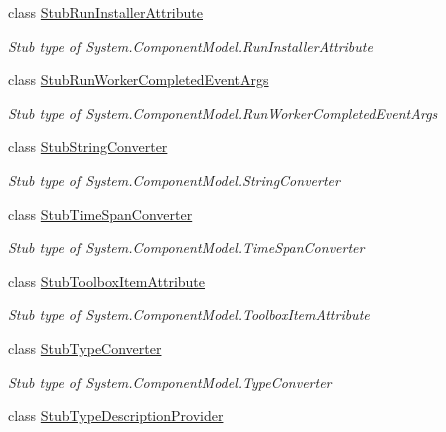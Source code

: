 \begin{DoxyCompactItemize}
class \hyperlink{class_system_1_1_component_model_1_1_fakes_1_1_stub_run_installer_attribute}{Stub\-Run\-Installer\-Attribute}
\begin{DoxyCompactList}\small\item\em Stub type of System.\-Component\-Model.\-Run\-Installer\-Attribute\end{DoxyCompactList}\item 
class \hyperlink{class_system_1_1_component_model_1_1_fakes_1_1_stub_run_worker_completed_event_args}{Stub\-Run\-Worker\-Completed\-Event\-Args}
\begin{DoxyCompactList}\small\item\em Stub type of System.\-Component\-Model.\-Run\-Worker\-Completed\-Event\-Args\end{DoxyCompactList}\item 
class \hyperlink{class_system_1_1_component_model_1_1_fakes_1_1_stub_string_converter}{Stub\-String\-Converter}
\begin{DoxyCompactList}\small\item\em Stub type of System.\-Component\-Model.\-String\-Converter\end{DoxyCompactList}\item 
class \hyperlink{class_system_1_1_component_model_1_1_fakes_1_1_stub_time_span_converter}{Stub\-Time\-Span\-Converter}
\begin{DoxyCompactList}\small\item\em Stub type of System.\-Component\-Model.\-Time\-Span\-Converter\end{DoxyCompactList}\item 
class \hyperlink{class_system_1_1_component_model_1_1_fakes_1_1_stub_toolbox_item_attribute}{Stub\-Toolbox\-Item\-Attribute}
\begin{DoxyCompactList}\small\item\em Stub type of System.\-Component\-Model.\-Toolbox\-Item\-Attribute\end{DoxyCompactList}\item 
class \hyperlink{class_system_1_1_component_model_1_1_fakes_1_1_stub_type_converter}{Stub\-Type\-Converter}
\begin{DoxyCompactList}\small\item\em Stub type of System.\-Component\-Model.\-Type\-Converter\end{DoxyCompactList}\item 
class \hyperlink{class_system_1_1_component_model_1_1_fakes_1_1_stub_type_description_provider}{Stub\-Type\-Description\-Provider}

\end{DoxyCompactItemize}
